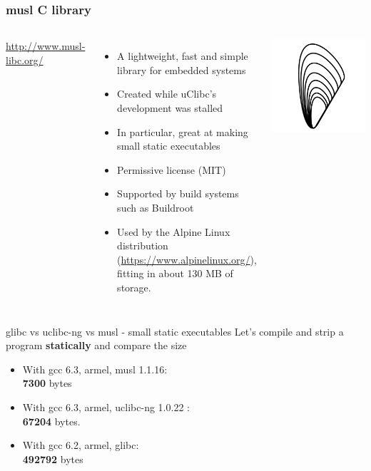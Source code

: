 \begin{frame}
  \frametitle{musl C library}
  \begin{columns}
      \url{http://www.musl-libc.org/}
      \begin{itemize}
      \item A lightweight, fast and simple library for embedded systems
      \item Created while uClibc's development was stalled
      \item In particular, great at making small static executables
      \item Permissive license (MIT)
      \item Supported by build systems such as Buildroot
      \item Used by the Alpine Linux distribution
        (\url{https://www.alpinelinux.org/}), fitting in about 130 MB of storage.
      \end{itemize}
    \includegraphics[width=\textwidth]{slides/c-libraries/musl.png}
  \end{columns}
\end{frame}

\begin{frame}{glibc vs uclibc-ng vs musl - small static executables}
  Let's compile and strip a  program {\bf statically} and
compare the size
  \begin{itemize}
    \item With gcc 6.3, armel, musl 1.1.16:\\
          {\bf 7300} bytes
    \item With gcc 6.3, armel, uclibc-ng 1.0.22 :\\
          {\bf 67204} bytes.
    \item With gcc 6.2, armel, glibc:\\
          {\bf 492792} bytes
  \end{itemize}
\end{frame}

